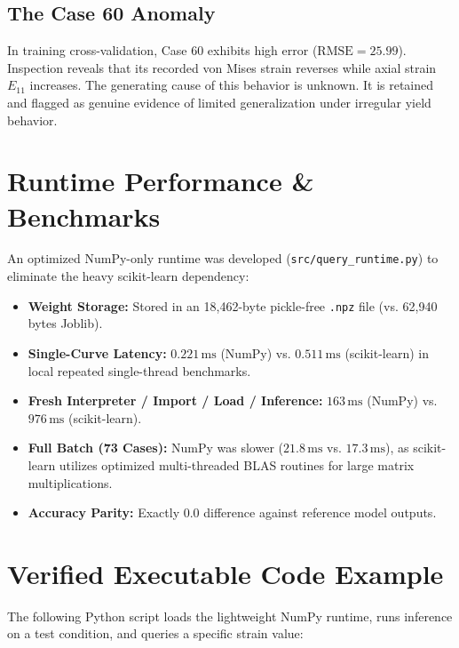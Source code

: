 \documentclass[11pt,a4paper]{article}
\begin{document}
\subsection{The Case 60 Anomaly}
In training cross-validation, Case 60 exhibits high error ($\text{RMSE} = 25.99$). Inspection reveals that its recorded von Mises strain reverses while axial strain $E_{11}$ increases. The generating cause of this behavior is unknown. It is retained and flagged as genuine evidence of limited generalization under irregular yield behavior.

\section{Runtime Performance \& Benchmarks}

An optimized NumPy-only runtime was developed (\texttt{src/query\_runtime.py}) to eliminate the heavy scikit-learn dependency:
\begin{itemize}
    \item \textbf{Weight Storage:} Stored in an 18,462-byte pickle-free \texttt{.npz} file (vs. 62,940 bytes Joblib).
    \item \textbf{Single-Curve Latency:} $0.221\,\text{ms}$ (NumPy) vs. $0.511\,\text{ms}$ (scikit-learn) in local repeated single-thread benchmarks.
    \item \textbf{Fresh Interpreter / Import / Load / Inference:} $163\,\text{ms}$ (NumPy) vs. $976\,\text{ms}$ (scikit-learn).
    \item \textbf{Full Batch (73 Cases):} NumPy was slower ($21.8\,\text{ms}$ vs. $17.3\,\text{ms}$), as scikit-learn utilizes optimized multi-threaded BLAS routines for large matrix multiplications.
    \item \textbf{Accuracy Parity:} Exactly $0.0$ difference against reference model outputs.
\end{itemize}

\section{Verified Executable Code Example}

The following Python script loads the lightweight NumPy runtime, runs inference on a test condition, and queries a specific strain value:
\end{document}
